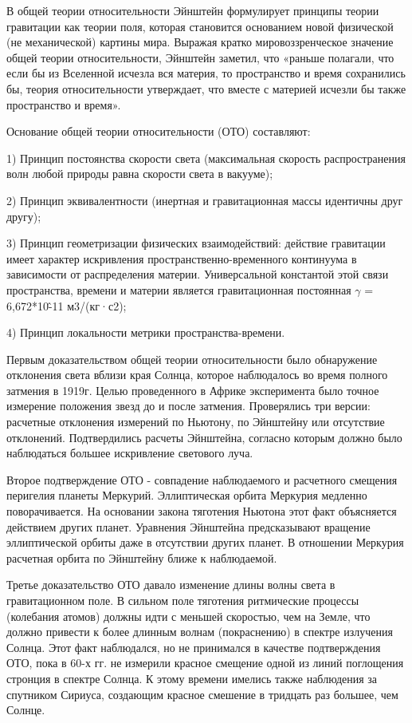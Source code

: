 \documentclass[exam_answers.tex]{subfiles}
\begin{document}
\renewcommand{\baselinestretch}{\blch}

В общей теории относительности Эйнштейн формулирует принципы
теории гравитации как теории поля, которая становится основанием новой
физической (не механической) картины мира. Выражая кратко
мировоззренческое значение общей теории относительности, Эйнштейн
заметил, что «раньше полагали, что если бы из Вселенной исчезла вся материя,
то пространство и время сохранились бы, теория относительности утверждает,
что вместе с материей исчезли бы также пространство и время».

Основание общей теории относительности (ОТО) составляют:

1) Принцип постоянства скорости света (максимальная скорость
распространения волн любой природы равна скорости света в вакууме);

2) Принцип эквивалентности (инертная и гравитационная массы
идентичны друг другу);

3) Принцип геометризации физических взаимодействий: действие
гравитации имеет характер искривления пространственно-временного
континуума в зависимости от распределения материи. Универсальной
константой этой связи пространства, времени и материи является
гравитационная постоянная $\gamma$ = 6,672*10\^{-11} м3/(кг·с2);

4) Принцип локальности метрики пространства-времени.

Первым доказательством общей теории относительности было
обнаружение отклонения света вблизи края Солнца, которое наблюдалось во
время полного затмения в 1919г. Целью проведенного в Африке эксперимента
было точное измерение положения звезд до и после затмения. Проверялись три
версии: расчетные отклонения измерений по Ньютону, по Эйнштейну или
отсутствие отклонений. Подтвердились расчеты Эйнштейна, согласно которым
должно было наблюдаться большее искривление светового луча.

Второе подтверждение ОТО - совпадение наблюдаемого и расчетного
смещения перигелия планеты Меркурий. Эллиптическая орбита Меркурия
медленно поворачивается. На основании закона тяготения Ньютона этот факт
объясняется действием других планет. Уравнения Эйнштейна предсказывают
вращение эллиптической орбиты даже в отсутствии других планет. В
отношении Меркурия расчетная орбита по Эйнштейну ближе к наблюдаемой.

Третье доказательство ОТО давало изменение длины волны света в
гравитационном поле. В сильном поле тяготения ритмические процессы
(колебания атомов) должны идти с меньшей скоростью, чем на Земле, что
должно привести к более длинным волнам (покраснению) в спектре излучения
Солнца. Этот факт наблюдался, но не принимался в качестве подтверждения
ОТО, пока в 60-х гг. не измерили красное смещение одной из линий
поглощения стронция в спектре Солнца. К этому времени имелись также
наблюдения за спутником Сириуса, создающим красное смешение в тридцать
раз большее, чем Солнце.
\end{document}
